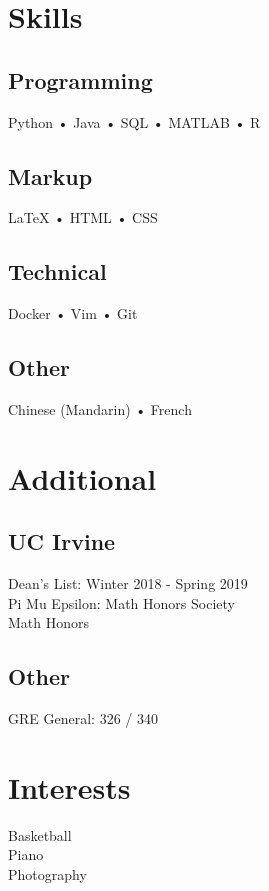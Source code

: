 \documentclass[]{deedy-resume-openfont}
\begin{document}
\begin{minipage}[t]{0.33\textwidth}

\section{Skills}
\subsection{Programming}
Python • Java • SQL • MATLAB • R
\subsection{Markup}
{\LaTeX} • HTML • CSS
\subsection{Technical}
Docker • Vim • Git
\subsection{Other}
Chinese (Mandarin) • French
\sectionsep


\section{Additional}
\subsection{UC Irvine}
Dean's List: Winter 2018 - Spring 2019 \\
Pi Mu Epsilon: Math Honors Society \\
Math Honors
\subsection{Other}
GRE General: 326 / 340 
\sectionsep

\section{Interests}
Basketball \\ Piano \\ Photography 
\sectionsep

%
%

\end{minipage} 
\hfill
\end{document}
